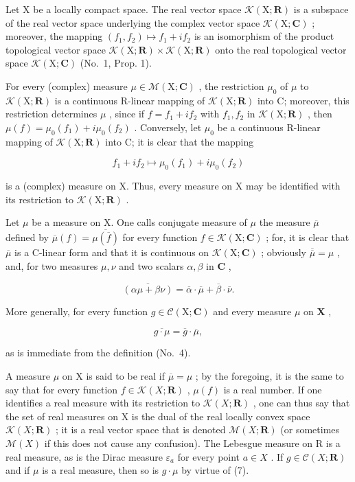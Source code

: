 Let X be a locally compact space. The real vector space \(\mathcal{K}(\mathrm{X};\mathbf{R})\) is a subspace of the real vector space underlying the complex vector space \(\mathcal{K}(\mathrm{X};\mathbf{C})\) ; moreover, the mapping \((f_{1},f_{2})\mapsto f_{1}+if_{2}\) is an isomorphism of the product topological vector space \(\mathcal{K}(\mathrm{X};\mathbf{R})\times\mathcal{K}(\mathrm{X};\mathbf{R})\) onto the real topological vector space \(\mathcal{K}(\mathrm{X};\mathbf{C})\) (No.~1, Prop. 1).

For every (complex) measure \(\mu\in\mathcal{M}(\mathrm{X};\mathbf{C})\) , the restriction \(\mu_{0}\) of \(\mu\) to \(\mathcal{K}(\mathrm{X};\mathbf{R})\) is a continuous R-linear mapping of \(\mathcal{K}(\mathrm{X};\mathbf{R})\) into C; moreover, this restriction determines \(\mu\) , since if \(f=f_{1}+if_{2}\) with \(f_{1},f_{2}\) in \(\mathcal{K}(\mathrm{X};\mathbf{R})\) , then \(\mu(f)=\mu_{0}(f_{1})+i\mu_{0}(f_{2})\) . Conversely, let \(\mu_{0}\) be a continuous R-linear mapping of \(\mathcal{K}(\mathrm{X};\mathbf{R})\) into C; it is clear that the mapping

\[
f _ {1} + i f _ {2} \mapsto \mu_ {0} (f _ {1}) + i \mu_ {0} (f _ {2})
\]

is a (complex) measure on X. Thus, every measure on X may be identified with its restriction to \(\mathcal{K}(\mathrm{X};\mathbf{R})\) .

Let \(\mu\) be a measure on X. One calls conjugate measure of \(\mu\) the measure \(\overline{\mu}\) defined by \(\overline{\mu}(f) = \overline{\mu(\overline{f})}\) for every function \(f \in \mathcal{K}(\mathrm{X};\mathbf{C})\) ; for, it is clear that \(\overline{\mu}\) is a C-linear form and that it is continuous on \(\mathcal{K}(\mathrm{X};\mathbf{C})\) ; obviously \(\overline{\overline{\mu}} = \mu\) , and, for two measures \(\mu, \nu\) and two scalars \(\alpha, \beta\) in \(\mathbf{C}\) ,

\[
\overline {{(\alpha \mu + \beta \nu)}} = \overline {{\alpha}} \cdot \overline {{\mu}} + \overline {{\beta}} \cdot \overline {{\nu}}.
\]

More generally, for every function \(g \in \mathcal{C}(\mathrm{X};\mathbf{C})\) and every measure \(\mu\) on \(\mathbf{X}\) ,

\[
\overline {{{g \cdot \mu}}} = \overline {{{g}}} \cdot \overline {{{\mu}}},\tag{7}
\]

as is immediate from the definition (No.~4).

A measure \(\mu\) on X is said to be real if \(\overline{\mu} = \mu\) ; by the foregoing, it is the same to say that for every function \(f \in \mathcal{K}(X; \mathbf{R})\) , \(\mu(f)\) is a real number. If one identifies a real measure with its restriction to \(\mathcal{K}(X; \mathbf{R})\) , one can thus say that the set of real measures on X is the dual of the real locally convex space \(\mathcal{K}(X; \mathbf{R})\) ; it is a real vector space that is denoted \(\mathcal{M}(X; \mathbf{R})\) (or sometimes \(\mathcal{M}(X)\) if this does not cause any confusion). The Lebesgue measure on R is a real measure, as is the Dirac measure \(\varepsilon_{a}\) for every point \(a \in X\) . If \(g \in \mathcal{C}(X; \mathbf{R})\) and if \(\mu\) is a real measure, then so is \(g \cdot \mu\) by virtue of (7).

